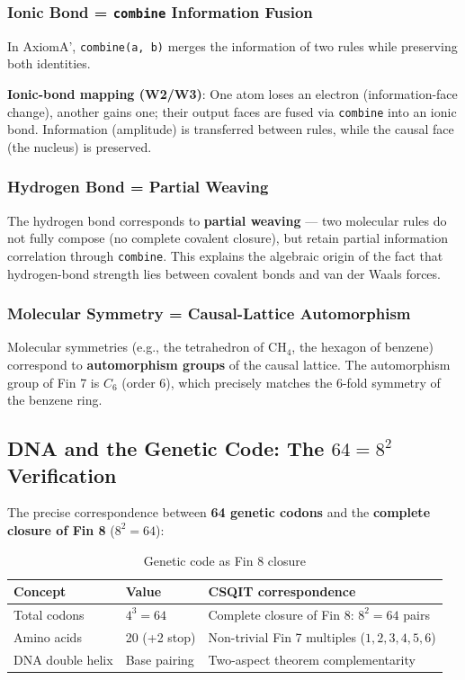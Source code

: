 \documentclass[aps,prd,twocolumn,nofootinbib,floatfix]{revtex4-2}
\begin{document}
\subsubsection{Ionic Bond = \texttt{combine} Information Fusion}

In AxiomA', \texttt{combine(a, b)} merges the information of two rules while preserving both identities.

\textbf{Ionic-bond mapping (W2/W3)}: One atom loses an electron (information-face change), another gains one; their output faces are fused via \texttt{combine} into an ionic bond. Information (amplitude) is transferred between rules, while the causal face (the nucleus) is preserved.

\subsubsection{Hydrogen Bond = Partial Weaving}

The hydrogen bond corresponds to \textbf{partial weaving} --- two molecular rules do not fully compose (no complete covalent closure), but retain partial information correlation through \texttt{combine}. This explains the algebraic origin of the fact that hydrogen-bond strength lies between covalent bonds and van der Waals forces.

\subsubsection{Molecular Symmetry = Causal-Lattice Automorphism}

Molecular symmetries (e.g., the tetrahedron of CH$_4$, the hexagon of benzene) correspond to \textbf{automorphism groups} of the causal lattice. The automorphism group of Fin 7 is $C_6$ (order 6), which precisely matches the 6-fold symmetry of the benzene ring.

\subsection{DNA and the Genetic Code: The $64 = 8^2$ Verification}

The precise correspondence between \textbf{64 genetic codons} and the \textbf{complete closure of Fin 8} ($8^2 = 64$):

\begin{table}[h]
\centering
\begin{tabular}{|l|l|l|}
\hline
Concept & Value & CSQIT correspondence \\
\hline
Total codons & $4^3 = 64$ & Complete closure of Fin 8: $8^2 = 64$ pairs \\
Amino acids & 20 (+2 stop) & Non-trivial Fin 7 multiples ($1,2,3,4,5,6$) \\
DNA double helix & Base pairing & Two-aspect theorem complementarity \\
\hline
\end{tabular}
\caption{Genetic code as Fin 8 closure}
\end{table}
\end{document}
